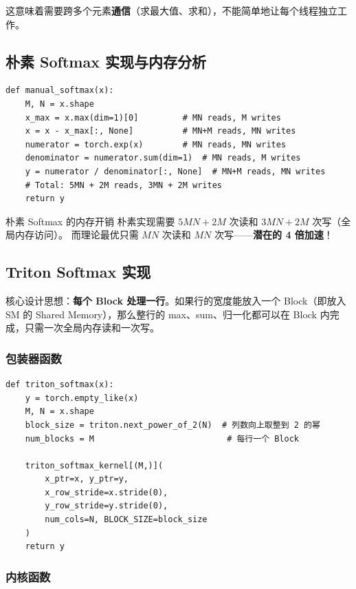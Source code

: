 \documentclass[a4paper]{article}
\begin{document}
这意味着需要跨多个元素\textbf{通信}（求最大值、求和），不能简单地让每个线程独立工作。

\subsection{朴素 Softmax 实现与内存分析}

\begin{lstlisting}[caption={朴素 Softmax 实现及内存读写分析}]
def manual_softmax(x):
    M, N = x.shape
    x_max = x.max(dim=1)[0]         # MN reads, M writes
    x = x - x_max[:, None]          # MN+M reads, MN writes
    numerator = torch.exp(x)        # MN reads, MN writes
    denominator = numerator.sum(dim=1)  # MN reads, M writes
    y = numerator / denominator[:, None]  # MN+M reads, MN writes
    # Total: 5MN + 2M reads, 3MN + 2M writes
    return y
\end{lstlisting}

\begin{importantbox}{朴素 Softmax 的内存开销}
朴素实现需要 $5MN + 2M$ 次读和 $3MN + 2M$ 次写（全局内存访问）。
而理论最优只需 $MN$ 次读和 $MN$ 次写——\textbf{潜在的 4 倍加速}！
\end{importantbox}

\subsection{Triton Softmax 实现}

核心设计思想：\textbf{每个 Block 处理一行}。如果行的宽度能放入一个 Block（即放入 SM 的 Shared Memory），那么整行的 max、sum、归一化都可以在 Block 内完成，只需一次全局内存读和一次写。

\subsubsection{包装器函数}

\begin{lstlisting}[caption={Triton Softmax 包装器}]
def triton_softmax(x):
    y = torch.empty_like(x)
    M, N = x.shape
    block_size = triton.next_power_of_2(N)  # 列数向上取整到 2 的幂
    num_blocks = M                           # 每行一个 Block

    triton_softmax_kernel[(M,)](
        x_ptr=x, y_ptr=y,
        x_row_stride=x.stride(0),
        y_row_stride=y.stride(0),
        num_cols=N, BLOCK_SIZE=block_size
    )
    return y
\end{lstlisting}

\subsubsection{内核函数}
\end{document}
